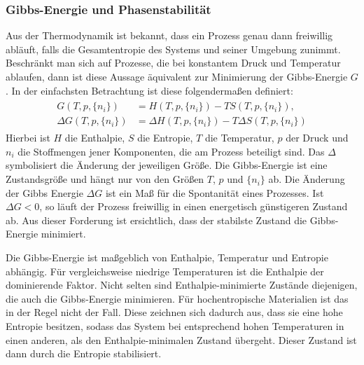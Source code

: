 \subsubsection{Gibbs-Energie und Phasenstabilität}
Aus der Thermodynamik ist bekannt, dass ein Prozess genau dann freiwillig abläuft, falls die Gesamtentropie des
Systems und seiner Umgebung zunimmt.
Beschränkt man sich auf Prozesse, die bei konstantem Druck und Temperatur ablaufen, dann ist diese Aussage äquivalent
zur Minimierung der Gibbs-Energie $G$.
In der einfachsten Betrachtung ist diese folgendermaßen definiert:
\begin{align}
    \begin{split}
        G(T,p, \{ n_{i} \})&=H(T,p,\{ n_{i} \})-TS(T,p,\{ n_{i} \}), \\
        \Delta G(T, p, \{ n_{i} \})&=\Delta H(T,p, \{ n_{i} \})-T \Delta S(T,p, \{ n_{i} \})
    \end{split}
    \label{eq:gibbs}
\end{align}
Hierbei ist $H$ die Enthalpie, $S$ die Entropie, $T$ die Temperatur, $p$ der Druck und $n_{i}$ die Stoffmengen jener
Komponenten, die am Prozess beteiligt sind.
Das $\Delta$ symbolisiert die Änderung der jeweiligen Größe.
Die Gibbs-Energie ist eine Zustandsgröße und hängt nur von den Größen $T$, $p$ und $\{ n_{i} \}$ ab.
Die Änderung der Gibbs Energie $\Delta G$ ist ein Maß für die Spontanität eines Prozesses.
Ist $\Delta G < 0$, so läuft der Prozess freiwillig in einen energetisch günstigeren Zustand ab.
Aus dieser Forderung ist ersichtlich, dass der stabilste Zustand die Gibbs-Energie minimiert.\autocite[7]{rost_phd}


Die Gibbs-Energie ist maßgeblich von Enthalpie, Temperatur und Entropie abhängig.
Für vergleichsweise niedrige Temperaturen ist die Enthalpie der dominierende Faktor.
Nicht selten sind Enthalpie-minimierte Zustände diejenigen, die auch die Gibbs-Energie minimieren.
Für hochentropische Materialien ist das in der Regel nicht der Fall.
Diese zeichnen sich dadurch aus, dass sie eine hohe Entropie besitzen, sodass das System
bei entsprechend hohen Temperaturen in einen anderen, als den Enthalpie-minimalen Zustand übergeht.
Dieser Zustand ist dann durch die Entropie stabilisiert.\autocite[2]{Rost2015}

